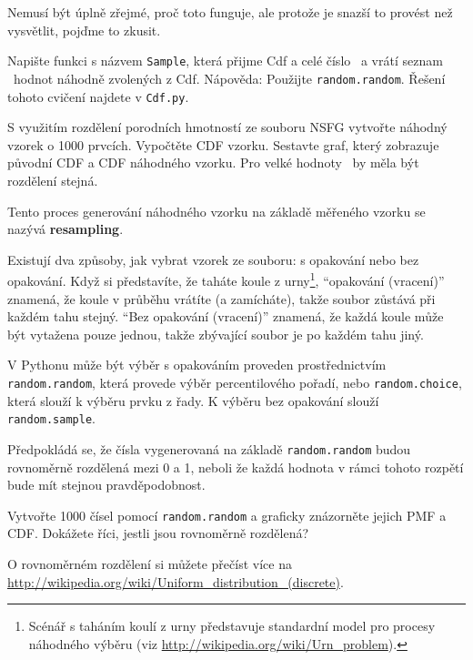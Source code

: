\documentclass[12pt]{book}
\begin{document}
Nemusí být úplně zřejmé, proč toto funguje, ale protože je snazší to provést než vysvětlit, pojďme to zkusit.

\begin{exercise}
Napište funkci s názvem {\tt Sample}, která přijme Cdf a celé číslo \n~a vrátí seznam  \n~hodnot náhodně zvolených z Cdf.  Nápověda: Použijte {\tt random.random}.
Řešení tohoto cvičení najdete v {\tt Cdf.py}.

S využitím rozdělení porodních hmotností ze souboru NSFG vytvořte náhodný vzorek o 1000 prvcích.  Vypočtěte CDF vzorku. Sestavte graf, který zobrazuje původní CDF a CDF náhodného vzorku.  Pro velké hodnoty \n~by měla být rozdělení stejná.

\end{exercise}

Tento proces generování náhodného vzorku na základě měřeného vzorku se nazývá {\bf resampling}.

Existují dva způsoby, jak vybrat vzorek ze souboru: s opakování nebo bez opakování. Když si představíte, že taháte koule z urny\footnote{Scénář s taháním koulí z urny představuje standardní model pro procesy náhodného výběru (viz \url{http://wikipedia.org/wiki/Urn_problem}).}, ``opakování (vracení)'' znamená, že koule v průběhu vrátíte (a zamícháte), takže soubor zůstává při každém tahu stejný. ``Bez opakování (vracení)'' znamená, že každá koule může být vytažena pouze jednou, takže zbývající soubor je po každém tahu jiný.

V Pythonu může být výběr s opakováním proveden prostřednictvím
{\tt random.random}, která provede výběr percentilového pořadí, nebo {\tt random.choice}, která slouží k výběru prvku z řady. K výběru bez opakování slouží {\tt random.sample}.

\begin{exercise}
Předpokládá se, že čísla vygenerovaná na základě {\tt random.random} budou
rovnoměrně rozdělená mezi 0 a 1, neboli že každá hodnota v rámci tohoto rozpětí bude mít stejnou pravděpodobnost.

Vytvořte 1000 čísel pomocí {\tt random.random} a graficky znázorněte jejich PMF a CDF.  Dokážete říci, jestli jsou rovnoměrně rozdělená?

O rovnoměrném rozdělení si můžete přečíst více na
\url{http://wikipedia.org/wiki/Uniform_distribution_(discrete)}.

\end{exercise}
\end{document}

